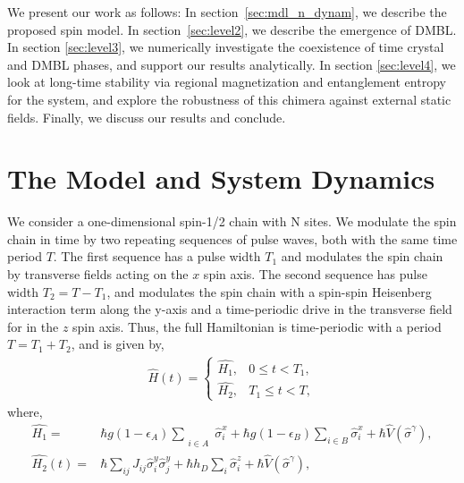 \documentclass[12pt]{iopart}
\begin{document}
We present our work as follows: In section~\ref{sec:mdl_n_dynam}, we describe the proposed spin model. In section~\ref{sec:level2}, we describe the emergence of DMBL. In section \ref{sec:level3}, we numerically investigate the coexistence of time crystal and DMBL phases, and support our results analytically. In section \ref{sec:level4}, we look at long-time stability via regional magnetization and entanglement entropy for the system, and explore the robustness of this chimera against external static fields. Finally, we discuss our results and conclude.	
	
\section{\label{sec:mdl_n_dynam} The Model and System Dynamics}
We consider a one-dimensional spin-1/2 chain with N sites.  We modulate the spin chain in time by two repeating sequences of pulse waves, both with the same time period $T$.  The first sequence has a pulse width $T_1$ and modulates the spin chain by transverse fields acting on the $x$ spin axis. The second sequence has pulse width $T_2=T-T_1$, and modulates the spin chain with a spin-spin Heisenberg interaction term along the y-axis and a time-periodic drive in the transverse field for in the $z$ spin axis. Thus, the full Hamiltonian is time-periodic with a period $T=T_1+T_2$, and is given by,
\begin{align}
    \hat{H}(t) = 
    \begin{cases}
        \hat{H_1} , & 0\leq t < T_1,\\
        \hat{H_2} , & T_1\leq t < T,
    \end{cases}
    \label{eq:cleanham}
\end{align}
where,
\begin{align}
    \hat{H_1} = & \hbar g (1-\epsilon_A) \sum_{\substack{\\i \in A}}\hat{\sigma}^x_i + \hbar g (1-\epsilon_B) \sum_{i \in B}\hat{\sigma}^x_i+ \hbar\hat{V}(\hat{\sigma}^{\gamma}),\label{eq:sysham1}\\
    \hat{H_2}(t) = & \hbar\sum_{ij} J_{ij} \hat{\sigma}^y_i \hat{\sigma}^y_{j} +  \hbar h_D \sum_i \hat{\sigma}^z_i + \hbar\hat{V}(\hat{\sigma}^{\gamma}),
    \label{eq:sysham2}
\end{align}
\end{document}

